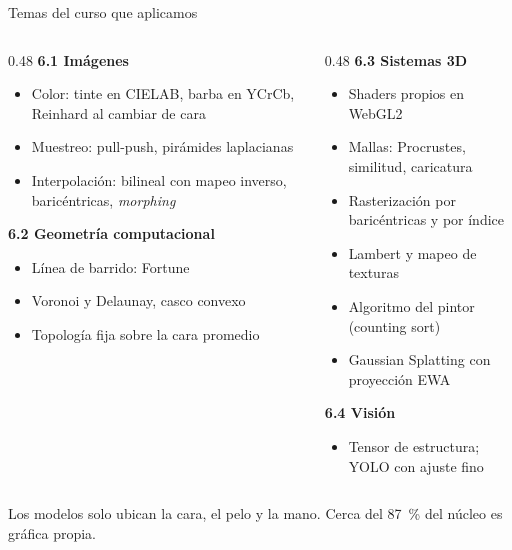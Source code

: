 \documentclass[aspectratio=169,11pt]{beamer}
\newcommand{\nota}[1]{{\color{muted}\small #1}}
\begin{document}
\begin{frame}{Temas del curso que aplicamos}
  \small
  \begin{columns}[T]
    \begin{column}{0.48\textwidth}
      \textbf{6.1 Imágenes}
      \begin{itemize}
        \item Color: tinte en CIELAB, barba en YCrCb, Reinhard al cambiar de cara
        \item Muestreo: pull-push, pirámides laplacianas
        \item Interpolación: bilineal con mapeo inverso, baricéntricas, \emph{morphing}
      \end{itemize}
      \textbf{6.2 Geometría computacional}
      \begin{itemize}
        \item Línea de barrido: Fortune
        \item Voronoi y Delaunay, casco convexo
        \item Topología fija sobre la cara promedio
      \end{itemize}
    \end{column}
    \begin{column}{0.48\textwidth}
      \textbf{6.3 Sistemas 3D}
      \begin{itemize}
        \item Shaders propios en WebGL2
        \item Mallas: Procrustes, similitud, caricatura
        \item Rasterización por baricéntricas y por índice
        \item Lambert y mapeo de texturas
        \item Algoritmo del pintor (counting sort)
        \item Gaussian Splatting con proyección EWA
      \end{itemize}
      \textbf{6.4 Visión}
      \begin{itemize}
        \item Tensor de estructura; YOLO con ajuste fino
      \end{itemize}
    \end{column}
  \end{columns}
  \vspace{0.6em}
  \nota{Los modelos solo ubican la cara, el pelo y la mano. Cerca del 87~\% del núcleo es gráfica propia.}
\end{frame}
\end{document}
